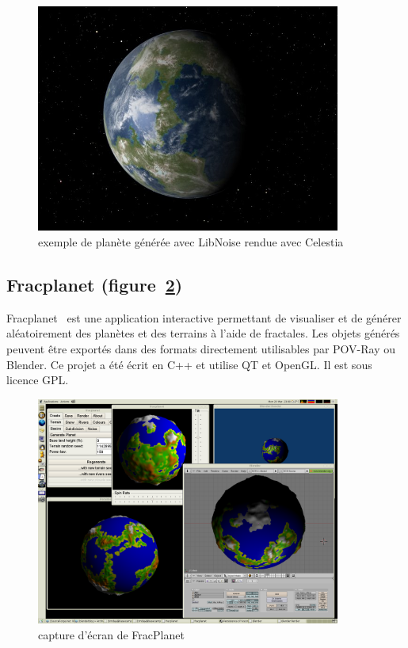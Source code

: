 \begin{figure}[!ht]
    \begin{center}
        \includegraphics[width=10cm]{resources/libnoise.jpg}
        \caption{exemple de planète générée avec LibNoise rendue avec Celestia}
        \label{fig:libnoise}
    \end{center}
\end{figure}

\subsection{Fracplanet (figure~\ref{fig:fracplanet})}

Fracplanet~\cite{FracPlanet} est une application interactive permettant de visualiser et de générer aléatoirement des planètes et des terrains à l'aide de fractales.
Les objets générés peuvent être exportés dans des formats directement
utilisables par POV-Ray ou Blender.
Ce projet a été écrit en C++ et utilise QT et OpenGL.
Il est sous licence GPL.

\begin{figure}[!ht]
    \begin{center}
        \includegraphics[width=10cm]{resources/fracplanet.png}
        \caption{capture d'écran de FracPlanet}
        \label{fig:fracplanet}
    \end{center}
\end{figure}

